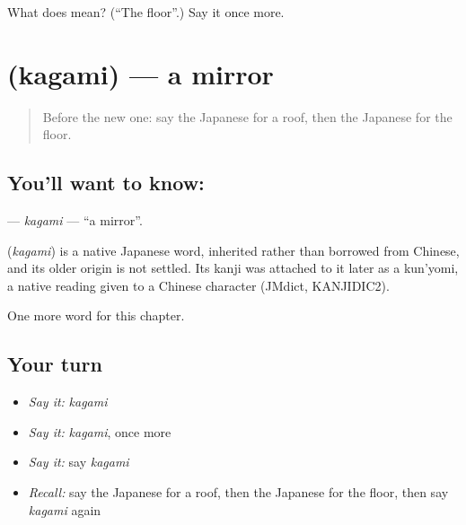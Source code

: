 \begin{tcolorbox}[breakable,colback=teal!4,colframe=teal!35!black,title={Before you move on}]
What does  mean? (\textquotedblleft{}The floor\textquotedblright{}.) Say it once more.
\end{tcolorbox}
\section[\texorpdfstring{\ja{かがみ} (kagami)}{かがみ (kagami)}]{ (kagami) — a mirror}

\label{lesson:JA-C38-kagami}



\begin{quote}
Before the new one: say the Japanese for a roof, then the Japanese for the floor.
\end{quote}

\subsection*{You'll want to know: }
\textbf{} — \emph{kagami} — \textquotedblleft{}a mirror\textquotedblright{}.

\begin{cousinweb}
\textbf{} (\emph{kagami}) is a native Japanese word, inherited rather than borrowed from Chinese, and its older origin is not settled. Its kanji was attached to it later as a kun'yomi, a native reading given to a Chinese character (JMdict, KANJIDIC2).
\end{cousinweb}

\begin{grammarlens}[title={What you've built}]
One more word for this chapter.
\end{grammarlens}

\subsection*{Your turn}
\begin{itemize}
\raggedright
  \item \emph{Say it:} \emph{kagami}
  \item \emph{Say it:} \emph{kagami}, once more
  \item \emph{Say it:} say \emph{kagami}
  \item \emph{Recall:} say the Japanese for a roof, then the Japanese for the floor, then say \emph{kagami} again
\end{itemize}

